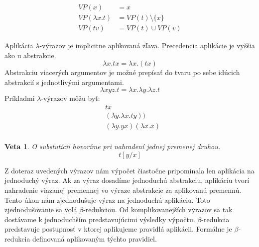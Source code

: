 \documentclass[a4paper,10pt,oneside]{report}%
\newtheorem{theorem}{Veta}[chapter]
\begin{document}
\begin{center}
    \begin{align*}
        VP(x) &= {x} \\
        VP(\lambda x.t) &= VP(t)  \setminus \{x\} \\
        VP(t v) &= VP(t) \cup VP(v)
    \end{align*}
\end{center}
    Aplikácia $\lambda$-výrazov je implicitne aplikovaná zľava.
    Precedencia aplikácie je vyššia ako u abstrakcie.
\begin{equation*}
    \lambda x . t x = \lambda x . (t x)
\end{equation*}
    Abstrakciu viacerých argumentov je možné prepísať do tvaru po sebe idúcich
abstrakcií s jednotlivými argumentami.
\begin{equation*}
    \lambda x y z . t = \lambda x . \lambda y . \lambda z . t
\end{equation*}
    Príkladmi $\lambda$-výrazov môžu byť:
\begin{align*}
    & t x                             \\
    & (\lambda y . \lambda x . t y )) \\
    & (\lambda y.y x) (\lambda x . x) \\
\end{align*}
\begin{theorem}
    O substutícii hovoríme pri nahradení jednej premenej druhou.
    \begin{equation}
        t [ y / x ]
    \end{equation}
\end{theorem}

    Z doteraz uvedených výrazov nám výpočet čiastočne pripomínala len aplikácia na
jednoduchý výraz.
    Ak za výraz dosadíme jednoduchú abstrakciu, aplikáciu tvorí nahradenie
viazanej premennej vo výraze abstrakcie za aplikovanú premennú.
    Tento úkon nám zjednodušuje výraz na jednoduchú aplikáciu.
    Toto zjednodušovanie sa volá $\beta$-redukciou.
    Od komplikovanejších výrazov sa tak dostávame k jednoduchším predstavujúcimi
výsledky výpočtu.
    $\beta$-redukcia predstavuje postupnosť v ktorej aplikujeme pravidlá
aplikácii.
    Formálne je $\beta$-redukcia definovaná aplikovaným týchto pravidiel.
\end{document}
